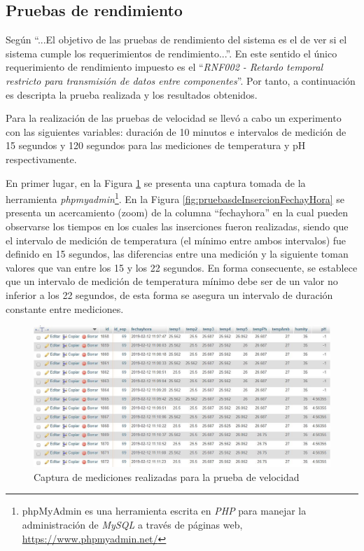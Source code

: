 \subsection{Pruebas de rendimiento}
\par Según \cite{PracticalSoftwareTesting} ``...El objetivo de las pruebas de rendimiento del sistema es el de ver si el sistema cumple los requerimientos de rendimiento...''. En este sentido el único requerimiento de rendimiento impuesto es el ``\textit{RNF002 - Retardo temporal restricto para transmisión de datos entre componentes}''. Por tanto, a continuación es descripta la prueba realizada y los resultados obtenidos.
\par
Para la realización de las pruebas de velocidad se llevó a cabo un experimento con las siguientes variables: duración de 10 minutos e intervalos de medición de 15 segundos y 120 segundos para las mediciones de temperatura y pH respectivamente.
\par 
En primer lugar, en la Figura \ref{fig:pruebasdeInsercion} se presenta una captura tomada de la herramienta \textit{phpmyadmin}\footnote{phpMyAdmin es una herramienta escrita en \textit{PHP} para manejar la administración de \textit{MySQL} a través de páginas web, \url{https://www.phpmyadmin.net/}}. En la Figura \ref{fig:pruebasdeInsercionFechayHora} se presenta un acercamiento (zoom) de la columna ``fechayhora'' en la cual  pueden observarse los tiempos en los cuales las inserciones fueron realizadas, siendo que el intervalo de medición de temperatura (el mínimo entre ambos intervalos) fue definido en 15 segundos, las diferencias entre una medición y la siguiente toman valores que van entre los 15 y los 22 segundos. En forma consecuente, se establece que un intervalo de medición de temperatura mínimo debe ser de un valor no inferior a los 22 segundos, de esta forma se asegura un intervalo de duración constante entre mediciones.
\begin{figure}[H]
    \centering
    \includegraphics[scale=0.5]{Pruebas/Inserciones.jpg}
    \caption{Captura de mediciones realizadas para la prueba de velocidad}
    \label{fig:pruebasdeInsercion}
\end{figure}
